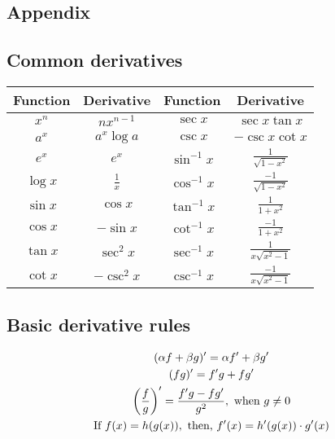 \documentclass[oneside,11pt,pdftex,final]{book}%
\numberwithin{equation}{section}
\numberwithin{section}{chapter}
\numberwithin{equation}{chapter}
\begin{document}
\backmatter
\appendix
\renewcommand{\thesection}{\Alph{section}.\arabic{section}}
\setcounter{section}{0}
\begin{appendices}
\chapter{Appendix}
\section{Common derivatives}
\begin{table}[h!]
	\centering
	\begin{tabular}{cccc}
		\hline
		Function & Derivative & Function & Derivative \\ \hline
		$x^n$ & $nx^{n-1}$ & $\sec x$ & $\sec x \tan x$ \\
		$a^x$ & $a^x \log a$ & $\csc x$ & $-\csc x \cot x$ \\
		$e^x$ & $e^x$ & $\sin^{-1} x$ & $\frac{1}{\sqrt{1-x^2}}$ \\
		$\log x$ & $\frac{1}{x}$ & $\cos^{-1} x$ & $\frac{-1}{\sqrt{1-x^2}}$ \\
		$\sin x$ & $\cos x$ & $\tan^{-1} x$ & $\frac{1}{1+x^2}$ \\
		$\cos x$ & $-\sin x$ & $\cot^{-1} x$ & $\frac{-1}{1+x^2}$ \\
		$\tan x$ & $\sec^2 x$ & $\sec^{-1} x$ & $\frac{1}{x \sqrt{x^2-1}}$ \\
		$\cot x$ & $-\csc^2 x$ & $\csc^{-1} x $ & $\frac{-1}{x\sqrt{x^2-1}}$ \\ \hline
	\end{tabular}
\end{table}
\section{Basic derivative rules}
\begin{gather*}
	(\alpha f+\beta g)'=\alpha f'+\beta g'\\
	(fg)'=f'g+fg'\\
	\left({\frac {f}{g}}\right)'={\frac {f'g-fg'}{g^{2}}}, \text{ when $ g\neq 0 $}\\
	\text{If }f(x)=h(g(x)), \text{ then, }f'(x)=h'(g(x))\cdot g'(x)
\end{gather*}
\clearpage

\end{appendices}
\end{document}
